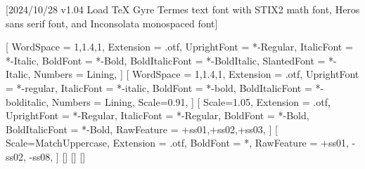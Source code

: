 
[2024/10/28 v1.04 Load TeX Gyre Termes text font with STIX2 math font, Heros sans serif font, and Inconsolata monospaced font]

%
%
\ifpdftex
	\RequirePackage[T1]{fontenc}	
	\RequirePackage{bm}
\else
    \RequirePackage[warnings-off={mathtools-colon,mathtools-overbracket}]{unicode-math}
    \setmainfont{TeXGyreTermesX}[%
		WordSpace = {1,1.4,1},%
    	Extension = .otf,
    	UprightFont = *-Regular,
    	ItalicFont = *-Italic,
    	BoldFont = *-Bold,
    	BoldItalicFont = *-BoldItalic,
		SlantedFont = *-Italic,
		Numbers = Lining,
	]
	\setsansfont{texgyreheros}[%
		WordSpace = {1,1.4,1},
		Extension = .otf,
    	UprightFont = *-regular,
    	ItalicFont = *-italic,
    	BoldFont = *-bold,
    	BoldItalicFont = *-bolditalic,
		Numbers = Lining,
    	Scale=0.91,%
	]        
	\setmonofont{Inconsolatazi4}[%
        Scale=1.05,%
        Extension = .otf,
        UprightFont = *-Regular,
        ItalicFont = *-Regular,%
        BoldFont = *-Bold, 
    	BoldItalicFont = *-Bold,%
        RawFeature = {+ss01,+ss02,+ss03},
    ]             
	[%
    	Scale=MatchUppercase,
    	Extension = .otf,
		BoldFont = *,%
    	RawFeature = {+ss01, -ss02, -ss08},
   ]
   \setmathfontface{}[]%
   \setmathfontface{}[]
   \setmathfontface{}[]%
   \newcommand*{\FRAC}[1]{{\addfontfeature{Fractions=On}#1}}%
\fi
